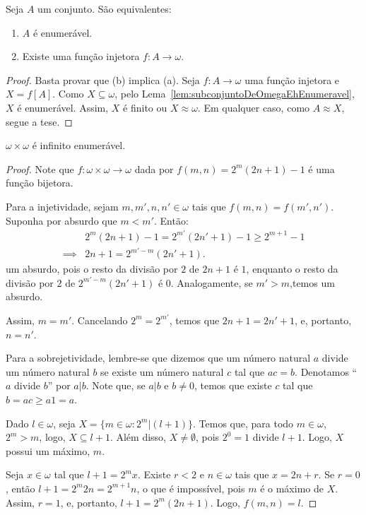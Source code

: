 \begin{proposition}[$Z^-$]\label{prop:caracterizacaoDaEnumerabilidade}
Seja $A$ um conjunto.
São equivalentes:
\begin{enumerate}[label=(\alph*)]
    \item $A$ é enumerável.
    \item Existe uma função injetora $f:A\rightarrow \omega$.
\end{enumerate}
\end{proposition}
\begin{proof}
    Basta provar que (b) implica (a).
    Seja $f:A\to \omega$ uma função injetora e $X=f[A]$.
    Como $X\subseteq \omega$, pelo Lema~\ref{lem:subconjuntoDeOmegaEhEnumeravel}, $X$ é enumerável.
    Assim, $X$ é finito ou $X\approx \omega$.
    Em qualquer caso, como $A\approx X$, segue a tese.
\end{proof}

\begin{proposition}[$Z^-$]\label{prop:omegaQuadradoEhEnumeravel}
    $\omega\times \omega$ é infinito enumerável.
\end{proposition}
\begin{proof}
    Note que $f:\omega\times \omega\to \omega$ dada por $f(m,n)=2^m(2n+1)-1$ é uma função bijetora.

    Para a injetividade, sejam $m, m', n, n'\in \omega$ tais que $f(m,n)=f(m',n')$.
    Suponha por absurdo que $m<m'$.
    Então:
    \begin{align*}
        &2^m(2n+1)-1 = 2^{m'}(2n'+1)-1 \geq 2^{m+1}-1\\
        \implies &2n+1 =2^{m'-m}(2n'+1).
    \end{align*}
    um absurdo, pois o resto da divisão por $2$ de $2n+1$ é $1$, enquanto o resto da divisão por $2$ de $2^{m'-m}(2n'+1)$ é $0$.
    Analogamente, se $m'>m$,temos um absurdo.

    Assim, $m=m'$. Cancelando $2^m=2^{m'}$, temos que $2n+1=2n'+1$, e, portanto, $n=n'$.

    Para a sobrejetividade, lembre-se que dizemos que um número natural $a$ divide um número natural $b$ se existe um número natural $c$ tal que $ac=b$.
    Denotamos ``$a$ divide $b$'' por $a|b$.
    Note que, se $a|b$ e $b\neq 0$, temos que existe $c$ tal que $b=ac\geq a1=a$.
    
    Dado $l\in \omega$, seja $X=\{m\in \omega : 2^m|(l+1)\}$.
    Temos que, para todo $m \in \omega$, $2^m>m$, logo, $X\subseteq l+1$.
    Além disso, $X\neq \emptyset$, pois $2^0=1$ divide $l+1$.
    Logo, $X$ possui um máximo, $m$.

    Seja $x\in \omega$ tal que $l+1=2^mx$.
    Existe $r<2$ e $n\in \omega$ tais que $x=2n+r$.
    Se $r=0$, então $l+1=2^m2n=2^{m+1}n$, o que é impossível, pois $m$ é o máximo de $X$.
    Assim, $r=1$, e, portanto, $l+1=2^m(2n+1)$.
    Logo, $f(m,n)=l$.
\end{proof}
